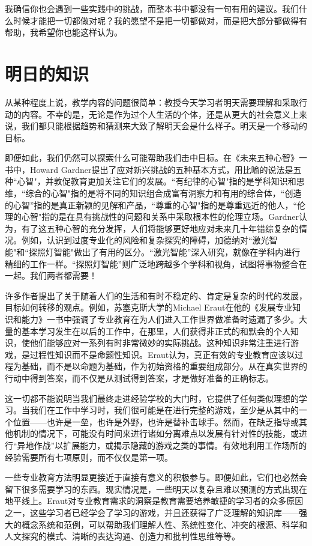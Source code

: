 我确信你也会遇到一些实践中的挑战，而整本书中都没有一句有用的建议。我们什么时候才能把一切都做对呢？我的愿望不是把一切都做对，而是把大部分都做得有帮助，我希望你也能这样认为。

\section*{明日的知识}

从某种程度上说，教学内容的问题很简单：教授今天学习者明天需要理解和采取行动的内容。不幸的是，无论是作为过个人生活的个体，还是从更大的社会意义上来说，我们都只能根据趋势和猜测来大致了解明天会是什么样子。明天是一个移动的目标。

即便如此，我们仍然可以探索什么可能帮助我们击中目标。在《未来五种心智》一书中，Howard Gardner提出了应对新兴挑战的五种基本方式，用比喻的说法是五种``心智"，并敦促教育更加关注它们的发展。``有纪律的心智"指的是学科知识和思维，``综合的心智"指的是将不同的知识组合成富有洞察力和有用的综合体，“创造的心智”指的是真正新颖的见解和产品，``尊重的心智"指的是尊重远近的他人，``伦理的心智"指的是在具有挑战性的问题和关系中采取根本性的伦理立场。Gardner认为，有了这五种心智的充分发挥，人们将能够更好地应对未来几十年错综复杂的情况。例如，认识到过度专业化的风险和复杂探究的障碍，加德纳对``激光智能"和``探照灯智能"做出了有用的区分。“激光智能”深入研究，就像在学科内进行精细的工作一样。“探照灯智能”则广泛地跨越多个学科和视角，试图将事物整合在一起。我们两者都需要！

许多作者提出了关于随着人们的生活和有时不稳定的、肯定是复杂的时代的发展，目标如何转移的观点。例如，苏塞克斯大学的Michael Eraut在他的《发展专业知识和能力》一书中强调了专业教育在为人们进入工作世界做准备时遗漏了多少。大量的基本学习发生在以后的工作中，在那里，人们获得非正式的和默会的个人知识，使他们能够应对一系列有时非常微妙的实际挑战。这种知识非常注重进行游戏，是过程性知识而不是命题性知识。Eraut认为，真正有效的专业教育应该以过程为基础，而不是以命题为基础，作为初始资格的重要组成部分。从在真实世界的行动中得到答案，而不仅是从测试得到答案，才是做好准备的正确标志。

这一切都不能说明当我们最终走进经验学校的大门时，它提供了任何类似理想的学习。当我们在工作中学习时，我们很可能是在进行完整的游戏，至少是从其中的一个位置——也许是一垒，也许是外野，也许是替补击球手。然而，在缺乏指导或其他机制的情况下，可能没有时间来进行诸如分离难点以发展有针对性的技能，或进行“异地作战”以扩展能力，或揭示隐藏的游戏之类的事情。有效地利用工作场所的经验需要所有七项原则，而不仅仅是第一项。

一些专业教育方法明显更接近于直接有意义的积极参与。即便如此，它们也必然会留下很多需要学习的东西。现实情况是，一些明天以复杂且难以预测的方式出现在地平线上。Eraut对专业教育需求的洞察是教育需要培养敏捷的学习者的众多原因之一，这些学习者已经学会了学习的游戏，并且还获得了广泛理解的知识库——强大的概念系统和范例，可以帮助我们理解人性、系统性变化、冲突的根源、科学和人文探究的模式、清晰的表达沟通、创造力和批判性思维等等。

